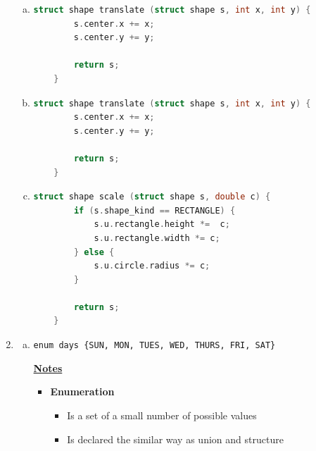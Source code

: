 \documentclass[12pt]{article}
\begin{document}
\begin{enumerate}[1.]
\begin{enumerate}[a)]
        \item

\begin{lstlisting}[language=c]
    struct shape translate (struct shape s, int x, int y) {
        s.center.x += x;
        s.center.y += y;

        return s;
    }
\end{lstlisting}

        \item

\begin{lstlisting}[language=c]
    struct shape translate (struct shape s, int x, int y) {
        s.center.x += x;
        s.center.y += y;

        return s;
    }
\end{lstlisting}

        \item

\begin{lstlisting}[language=c]
    struct shape scale (struct shape s, double c) {
        if (s.shape_kind == RECTANGLE) {
            s.u.rectangle.height *=  c;
            s.u.rectangle.width *= c;
        } else {
            s.u.circle.radius *= c;
        }

        return s;
    }
\end{lstlisting}

    \end{enumerate}

    \item

    \begin{enumerate}[a)]

        \item

        \texttt{enum days \{SUN, MON, TUES, WED, THURS, FRI, SAT\}}

        \bigskip

        \underline{\textbf{Notes}}

        \begin{itemize}
            \item \textbf{Enumeration}

            \begin{itemize}
                \item Is a set of a small number of possible values
                \item Is declared the similar way as union and structure

                \bigskip


\end{itemize}
\end{itemize}
\end{enumerate}
\end{enumerate}
\end{document}
